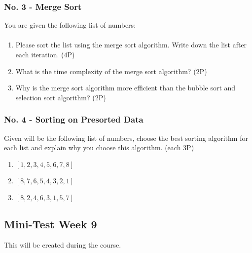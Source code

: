 \documentclass[10pt, oneside]{article}
\theoremstyle{remark}
\begin{document}
\subsubsection{No. 3 - Merge Sort}
You are given the following list of numbers:
\begin{align*}
  [8, 2, 4, 6, 3, 1, 5, 7]
\end{align*}
\begin{enumerate}
  \item Please sort the list using the merge sort algorithm. Write down the list after each iteration. ($4$P)
  \item What is the time complexity of the merge sort algorithm? ($2$P)
  \item Why is the merge sort algorithm more efficient than the bubble sort and selection sort algorithm? ($2$P)
\end{enumerate}

\subsubsection{No. 4 - Sorting on Presorted Data}
Given will be the following list of numbers, choose the best sorting algorithm for each list and explain why you choose this algorithm. (each $3$P)
\begin{enumerate}
  \item $[1, 2, 3, 4, 5, 6, 7, 8]$
  \item $[8, 7, 6, 5, 4, 3, 2, 1]$
  \item $[8, 2, 4, 6, 3, 1, 5, 7]$
\end{enumerate}

\subsection{Mini-Test Week 9}
This will be created during the course.
\end{document}
